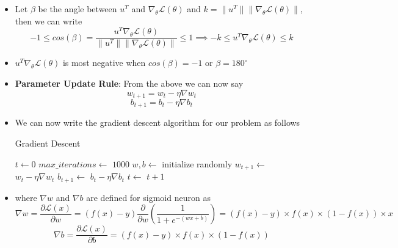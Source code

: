 \documentclass[a4paper]{article}
\begin{document}
\begin{itemize}
\begin{equation*}
    \end{equation*}
    \item Let $\beta$ be the angle between $u^T$ and $\nabla_\theta \mathcal{L}(\theta)$ and $k=\lVert u^T\rVert \lVert\nabla_\theta \mathcal{L}(\theta)\rVert$, then we can write
    \begin{equation*}
        -1\leq cos(\beta) = \frac{u^T\nabla_\theta \mathcal{L}(\theta)}{\lVert u^T \rVert \lVert \nabla_\theta \mathcal{L}(\theta)\rVert}\leq 1\implies -k\leq u^T\nabla_\theta \mathcal{L}(\theta)\leq k
    \end{equation*}
    \item $u^T\nabla_\theta \mathcal{L}(\theta)$ is most negative when $cos(\beta)=-1$ or $\beta=180^\circ$
    \item \textbf{Parameter Update Rule}: From the above we can now say
    \begin{equation*}
        w_{t+1} = w_t-\eta \nabla w_t
    \end{equation*}
    \begin{equation*}
        b_{t+1} = b_t - \eta \nabla b_t
    \end{equation*}
    \item We can now write the gradient descent algorithm for our problem as follows
    \begin{algorithm}[H]
        \caption{Gradient Descent}\label{alg:SE-Gradient-Descent}
        \begin{algorithmic}[1]
            \Statex {}
            \State $t\gets 0$
            \State $max\_iterations \gets$ $1000$
            \State $w,b \gets$ initialize randomly
                \State $w_{t+1}\gets$ $w_t-\eta \nabla w_t$
                \State $b_{t+1}\gets$ $b_t-\eta \nabla b_t$
                \State $t\gets$ $t+1$
            \EndWhile
        \end{algorithmic}
    \end{algorithm}
    \item where $\nabla w$ and $\nabla b$ are defined for sigmoid neuron as
    \begin{equation*}
        \nabla w=\frac{\partial \mathcal{L}(x)}{\partial w} = (f(x)-y)\frac{\partial}{\partial w}(\frac{1}{1+e^{-(wx+b)}})=(f(x)-y)\times f(x)\times (1-f(x))\times x
    \end{equation*}
    \begin{equation*}
        \nabla b=\frac{\partial \mathcal{L}(x)}{\partial b}=(f(x)-y)\times f(x)\times (1-f(x))
    \end{equation*}
\end{itemize}
\end{document}
